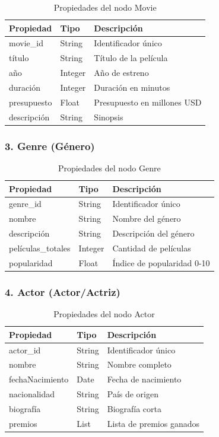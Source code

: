 \documentclass[12pt]{article}
\begin{document}
\begin{table}[h]
\centering
\begin{tabular}{|l|l|l|}
\hline
\textbf{Propiedad} & \textbf{Tipo} & \textbf{Descripción} \\
\hline
movie\_id & String & Identificador único \\
título & String & Título de la película \\
año & Integer & Año de estreno \\
duración & Integer & Duración en minutos \\
presupuesto & Float & Presupuesto en millones USD \\
descripción & String & Sinopsis \\
\hline
\end{tabular}
\caption{Propiedades del nodo Movie}
\end{table}

\subsubsection{3. Genre (Género)}

\begin{table}[h]
\centering
\begin{tabular}{|l|l|l|}
\hline
\textbf{Propiedad} & \textbf{Tipo} & \textbf{Descripción} \\
\hline
genre\_id & String & Identificador único \\
nombre & String & Nombre del género \\
descripción & String & Descripción del género \\
películas\_totales & Integer & Cantidad de películas \\
popularidad & Float & Índice de popularidad 0-10 \\
\hline
\end{tabular}
\caption{Propiedades del nodo Genre}
\end{table}

\subsubsection{4. Actor (Actor/Actriz)}

\begin{table}[h]
\centering
\begin{tabular}{|l|l|l|}
\hline
\textbf{Propiedad} & \textbf{Tipo} & \textbf{Descripción} \\
\hline
actor\_id & String & Identificador único \\
nombre & String & Nombre completo \\
fechaNacimiento & Date & Fecha de nacimiento \\
nacionalidad & String & País de origen \\
biografía & String & Biografía corta \\
premios & List & Lista de premios ganados \\
\hline
\end{tabular}
\caption{Propiedades del nodo Actor}
\end{table}
\end{document}
